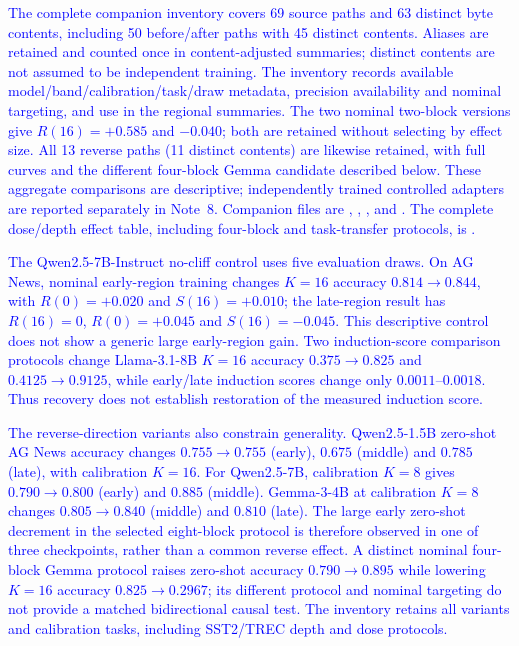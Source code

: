\documentclass[11pt]{article}
\begin{document}
\begin{sloppypar}
\textcolor{blue}{The complete companion inventory covers 69 source paths and 63 distinct byte contents,
including 50 before/after paths with 45 distinct contents. Aliases are retained and counted
once in content-adjusted summaries; distinct contents are not assumed to be independent
training. The inventory records available model/band/calibration/task/draw metadata,
precision availability and nominal targeting, and use in the regional summaries.
The two nominal two-block versions give $R(16)=+0.585$ and $-0.040$; both are retained
without selecting by effect size. All 13 reverse paths (11 distinct contents) are likewise
retained, with full curves and the different four-block Gemma candidate described below. These aggregate comparisons are descriptive; independently trained
controlled adapters are reported separately in Note~8.
Companion files are }\textcolor{blue}{,
}\textcolor{blue}{,
}\textcolor{blue}{,
} \textcolor{blue}{and
}\textcolor{blue}{. The complete dose/depth effect
table, including four-block and task-transfer protocols, is
}\textcolor{blue}{.}
\end{sloppypar}

\textcolor{blue}{The Qwen2.5-7B-Instruct no-cliff control uses five evaluation draws.
On AG News, nominal early-region training changes $K=16$ accuracy
$0.814\to0.844$, with $R(0)=+0.020$ and $S(16)=+0.010$; the late-region result
has $R(16)=0$, $R(0)=+0.045$ and $S(16)=-0.045$. This descriptive control
does not show a generic large early-region gain. Two induction-score comparison
protocols change Llama-3.1-8B $K=16$ accuracy $0.375\to0.825$ and
$0.4125\to0.9125$, while early/late induction scores change only $0.0011$--$0.0018$.
Thus recovery does not establish restoration of the measured induction score.}

\textcolor{blue}{The reverse-direction variants also constrain generality. Qwen2.5-1.5B
zero-shot AG News accuracy changes $0.755\to0.755$ (early), $0.675$ (middle)
and $0.785$ (late), with calibration $K=16$. For Qwen2.5-7B, calibration $K=8$
gives $0.790\to0.800$ (early) and $0.885$ (middle). Gemma-3-4B at calibration
$K=8$ changes $0.805\to0.840$ (middle) and $0.810$ (late). The large early
zero-shot decrement in the selected eight-block protocol is therefore observed in
one of three checkpoints, rather than a common reverse effect. A distinct nominal
four-block Gemma protocol raises zero-shot accuracy $0.790\to0.895$ while
lowering $K=16$ accuracy $0.825\to0.2967$; its different protocol and nominal
targeting do not provide a matched bidirectional causal test. The inventory retains
all variants and calibration tasks, including SST2/TREC depth and dose protocols.}
\end{document}
